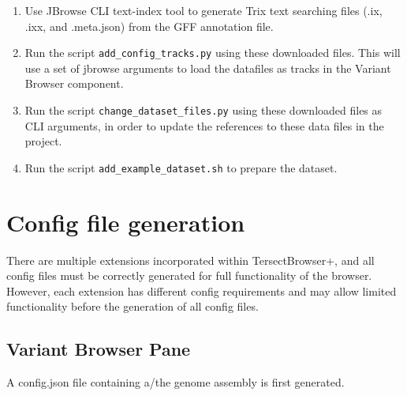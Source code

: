 \documentclass[12pt]{article}
\begin{document}
\begin{enumerate}
\begin{itemize}
    \end{itemize}
    \item Use JBrowse CLI text-index tool to generate Trix text searching files (.ix, .ixx, and .meta.json) from the GFF annotation file.
    \item Run the script \verb+add_config_tracks.py+ using these downloaded files. This will use a set of jbrowse arguments to load the datafiles as tracks in the Variant Browser component.
    \item Run the script \verb+change_dataset_files.py+ using these downloaded files as CLI arguments, in order to update the references to these data files in the project.
    \item Run the script \verb+add_example_dataset.sh+ to prepare the dataset.
\end{enumerate}

\section{Config file generation}
There are multiple extensions incorporated within TersectBrowser+, and all config files must be correctly generated for full functionality of the browser. However, each extension has different config requirements and may allow limited functionality before the generation of all config files.

\subsection{Variant Browser Pane}
A config.json file containing a/the genome assembly is first generated. 
\end{document}
